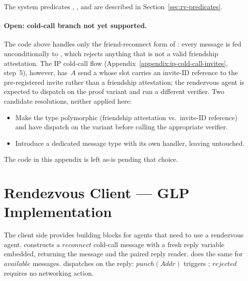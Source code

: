The system predicates , , and  are described in Section~\ref{sec:rv-predicates}.

\paragraph{Open: cold-call branch not yet supported.}
The code above handles only the friend-reconnect form of : every  message is fed unconditionally to , which rejects anything that is not a valid friendship attestation.  The IP cold-call flow (Appendix~\ref{appendix:ip-cold-call-invites}, step~5), however, has~$A$ send a  whose  slot carries an invite-ID reference to the pre-registered invite rather than a friendship attestation; the rendezvous agent is expected to dispatch on the proof variant and run a different verifier.  Two candidate resolutions, neither applied here:
\begin{itemize}
\item Make the  type polymorphic (friendship attestation vs.\ invite-ID reference) and have  dispatch on the variant before calling the appropriate verifier.
\item Introduce a dedicated  message type with its own handler, leaving  untouched.
\end{itemize}
The code in this appendix is left as-is pending that choice.

\section{Rendezvous Client --- GLP Implementation}
\label{appendix:rv-client}
The client side provides building blocks for agents that need to use a rendezvous agent.   constructs a $\mathit{reconnect}$ cold-call message with a fresh reply variable embedded, returning the message and the paired reply reader.   does the same for $\mathit{available}$ messages.   dispatches on the reply: $\mathit{punch}(\mathit{Addr})$ triggers ; $\mathit{rejected}$ requires no networking action.

